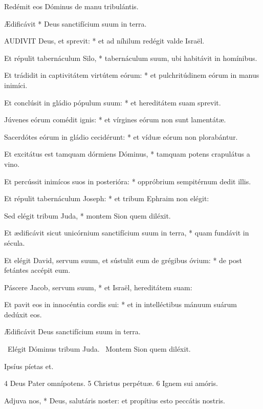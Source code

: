  Redémit eos Dóminus de manu tribulántis.

 Ædificávit * Deus sanctifícium suum in terra.


\lettrine[lines=2]{A}{UDIVIT} Deus, et sprevit: * et ad níhilum redégit valde Israël.

Et répulit tabernáculum Silo, * tabernáculum suum, ubi habitávit in homínibus.

Et trádidit in captivitátem virtútem eórum: * et pulchritúdinem eórum in manus inimíci.

Et conclúsit in gládio pópulum suum: * et hereditátem suam sprevit.

Júvenes eórum comédit ignis: * et vírgines eórum non sunt lamentátæ.

Sacerdótes eórum in gládio cecidérunt: * et víduæ eórum non plorabántur.

Et excitátus est tamquam dórmiens Dóminus, * tamquam potens crapulátus a vino.

Et percússit inimícos suos in posterióra: * oppróbrium sempitérnum dedit illis.

Et répulit tabernáculum Joseph: * et tribum Ephraim non elégit:

Sed elégit tribum Juda, * montem Sion quem diléxit.

Et ædificávit sicut unicórnium sanctifícium suum in terra, * quam fundávit in sécula.

Et elégit David, servum suum, et sústulit eum de grégibus óvium: * de post fetántes accépit eum.

Páscere Jacob, servum suum, * et Israël, hereditátem suam:

Et pavit eos in innocéntia cordis sui: * et in intelléctibus mánuum suárum dedúxit eos.

 Ædificávit Deus sanctifícium suum in terra.


\V\ Elégit Dóminus tribum Juda. \R\ Montem Sion quem diléxit.

 Ipsíus píetas et.

 4 Deus Pater omnípotens. 5 Christus perpétuæ. 6 Ignem sui amóris.


 Adjuva nos, * Deus, salutáris noster: et propítius esto peccátis nostris.

